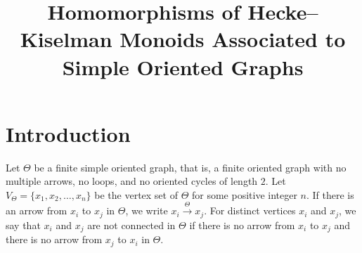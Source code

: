 \documentclass[pdflatex,sn-mathphys-num]{sn-jnl}
\newcommand{\tot}{\overset{\Theta}{\to}}
\theoremstyle{definition}
\theoremstyle{remark}
\begin{document}
\title[Homomorphisms of Hecke--Kiselman Monoids Associated to Simple Oriented Graphs]{Homomorphisms of Hecke--Kiselman Monoids Associated to Simple Oriented Graphs}


\author*[1]{ }









\maketitle























\section{Introduction}

Let $\Theta$ be a finite simple oriented graph, that is, a finite oriented graph with no multiple arrows, no loops, and no oriented cycles of length $2$.
Let $V_{\Theta} = \{x_1, x_2, \dots, x_n\}$ be the vertex set of $\Theta$ for some positive integer $n$.
If there is an arrow from $x_i$ to $x_j$ in $\Theta$, we write $x_i \tot x_j$.
For distinct vertices $x_i$ and $x_j$, we say that $x_i$ and $x_j$ are not connected in $\Theta$ if there is no arrow from $x_i$ to $x_j$ and there is no arrow from $x_j$ to $x_i$ in $\Theta$.
\end{document}
